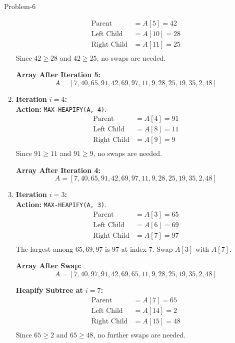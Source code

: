 \begin{problem}{}{Problem-6}
\begin{enumerate}[label=(\roman*)]
		\[
		\begin{aligned}
			\text{Parent} &= A[5] = 42 \\
			\text{Left Child} &= A[10] = 28 \\
			\text{Right Child} &= A[11] = 25 \\
		\end{aligned}
		\]
		Since \( 42 \geq 28 \) and \( 42 \geq 25 \), no swaps are needed.
		
		\textbf{Array After Iteration 5:}
		\[
		A = [7, 40, 65, 91, 42, 69, 97, 11, 9, 28, 25, 19, 35, 2, 48]
		\]
		
		\item \textbf{Iteration \( i = 4 \):} \\
		\textbf{Action:}  \texttt{MAX-HEAPIFY(A, 4)}. \\
		
		\[
		\begin{aligned}
			\text{Parent} &= A[4] = 91 \\
			\text{Left Child} &= A[8] = 11 \\
			\text{Right Child} &= A[9] = 9 \\
		\end{aligned}
		\]
		Since \( 91 \geq 11 \) and \( 91 \geq 9 \), no swaps are needed.
		
		\textbf{Array After Iteration 4:}
		\[
		A = [7, 40, 65, 91, 42, 69, 97, 11, 9, 28, 25, 19, 35, 2, 48]
		\]
		
		\item \textbf{Iteration \( i = 3 \):} \\
		\textbf{Action:}  \texttt{MAX-HEAPIFY(A, 3)}. \\
		
		\[
		\begin{aligned}
			\text{Parent} &= A[3] = 65 \\
			\text{Left Child} &= A[6] = 69 \\
			\text{Right Child} &= A[7] = 97 \\
		\end{aligned}
		\]
		The largest among \( 65, 69, 97 \) is \( 97 \) at index \( 7 \). Swap \( A[3] \) with \( A[7] \).
		
		\textbf{Array After Swap:}
		\[
		A = [7, 40, 97, 91, 42, 69, 65, 11, 9, 28, 25, 19, 35, 2, 48]
		\]
		
		\textbf{Heapify Subtree at \( i = 7 \):} \\
		\[
		\begin{aligned}
			\text{Parent} &= A[7] = 65 \\
			\text{Left Child} &= A[14] = 2 \\
			\text{Right Child} &= A[15] = 48 \\
		\end{aligned}
		\]
		Since \( 65 \geq 2 \) and \( 65 \geq 48 \), no further swaps are needed.
		

\end{enumerate}
\end{problem}

